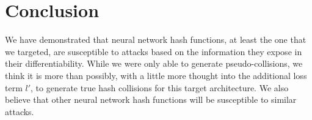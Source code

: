 \documentclass{article}
\begin{document}
\section{Conclusion}
We have demonstrated that neural network hash functions, at least the one that
we targeted, are susceptible to attacks based on the information they expose in
their differentiability. While we were only able to generate pseudo-collisions,
we think it is more than possibly, with a little more thought into the
additional loss term $l'$, to generate true hash collisions for this target
architecture. We also believe that other neural network hash functions will be
susceptible to similar attacks.


 
\end{document}

